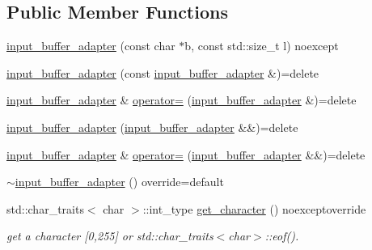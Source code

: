 \subsection*{Public Member Functions}
\begin{DoxyCompactItemize}
\item 
\hyperlink{classnlohmann_1_1detail_1_1input__buffer__adapter_ad9b912fabdcb53de255e8c444d625ac3}{input\+\_\+buffer\+\_\+adapter} (const char $\ast$b, const std\+::size\+\_\+t l) noexcept
\item 
\hyperlink{classnlohmann_1_1detail_1_1input__buffer__adapter_ada76d7b75c5d6b989af0e18687ef07b6}{input\+\_\+buffer\+\_\+adapter} (const \hyperlink{classnlohmann_1_1detail_1_1input__buffer__adapter}{input\+\_\+buffer\+\_\+adapter} \&)=delete
\item 
\hyperlink{classnlohmann_1_1detail_1_1input__buffer__adapter}{input\+\_\+buffer\+\_\+adapter} \& \hyperlink{classnlohmann_1_1detail_1_1input__buffer__adapter_a0871125057d993684ba8e45fb2b8a76b}{operator=} (\hyperlink{classnlohmann_1_1detail_1_1input__buffer__adapter}{input\+\_\+buffer\+\_\+adapter} \&)=delete
\item 
\hyperlink{classnlohmann_1_1detail_1_1input__buffer__adapter_ab6bc6bb785408b74af284a5b7544d9dc}{input\+\_\+buffer\+\_\+adapter} (\hyperlink{classnlohmann_1_1detail_1_1input__buffer__adapter}{input\+\_\+buffer\+\_\+adapter} \&\&)=delete
\item 
\hyperlink{classnlohmann_1_1detail_1_1input__buffer__adapter}{input\+\_\+buffer\+\_\+adapter} \& \hyperlink{classnlohmann_1_1detail_1_1input__buffer__adapter_a19bb3ff68048a2fc8ecc41a013af37ae}{operator=} (\hyperlink{classnlohmann_1_1detail_1_1input__buffer__adapter}{input\+\_\+buffer\+\_\+adapter} \&\&)=delete
\item 
\hyperlink{classnlohmann_1_1detail_1_1input__buffer__adapter_ac242b822b2f6772e5fc682ddb80cb066}{$\sim$input\+\_\+buffer\+\_\+adapter} () override=default
\item 
std\+::char\+\_\+traits$<$ char $>$\+::int\+\_\+type \hyperlink{classnlohmann_1_1detail_1_1input__buffer__adapter_a3a8ded2e453b8372353aed38302f30f1}{get\+\_\+character} () noexceptoverride
\begin{DoxyCompactList}\small\item\em get a character \mbox{[}0,255\mbox{]} or std\+::char\+\_\+traits$<$char$>$\+::eof(). \end{DoxyCompactList}\end{DoxyCompactItemize}

